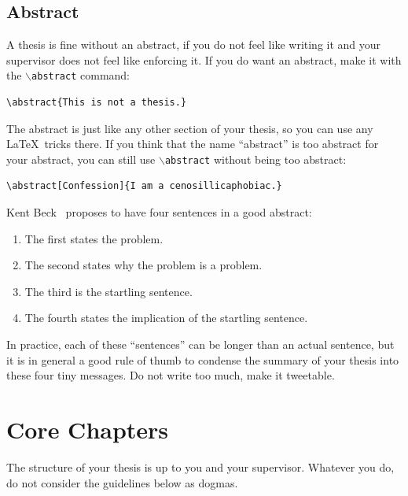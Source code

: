 \documentclass{uvamscse}
\newcommand{\cmd}[1]{\texttt{$\backslash$#1}}
\begin{document}
\section{Abstract}

A thesis is fine without an abstract, if you do not feel like writing it and
your supervisor does not feel like enforcing it. If you do want an abstract,
make it with the \cmd{abstract} command:

\begin{snippet}
\begin{verbatim}
\abstract{This is not a thesis.}
\end{verbatim}
\end{snippet}

The abstract is just like any other section of your thesis, so you can use any
\LaTeX\ tricks there. If you think that the name ``abstract'' is too abstract
for your abstract, you can still use \cmd{abstract} without being too
abstract:

\begin{snippet}
\begin{verbatim}
\abstract[Confession]{I am a cenosillicaphobiac.}
\end{verbatim}
\end{snippet}

Kent Beck~\cite{JohnsonBBCGW93} proposes to have four sentences in a good abstract:

\begin{enumerate}
  \item The first states the problem.
  \item The second states why the problem is a problem.
  \item The third is the startling sentence.
  \item The fourth states the implication of the startling sentence.
\end{enumerate}

In practice, each of these ``sentences'' can be longer than an actual
sentence, but it is in general a good rule of thumb to condense the summary of
your thesis into these four tiny messages. Do not write too much, make it
tweetable.

\chapter{Core Chapters}

The structure of your thesis is up to you and your supervisor. Whatever you
do, do not consider the guidelines below as dogmas.
\end{document}
